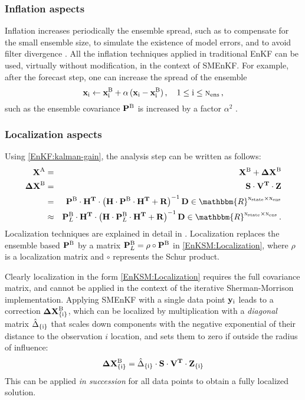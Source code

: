 \documentclass[12pt]{article}
\newcommand{\Nens}{\textsc{n}_{{\rm ens}}}
\newcommand{\Nstate}{\textsc{n}_{{\rm state}}}
\newcommand{\XA}{{\bf X}^{\rm A}}
\newcommand{\XB}{{\bf X}^{\rm B}}
\newcommand{\DXB}{{\bf \Delta X}^{\rm B}}
\newcommand{\xb}[1]{{\bf x}^{\rm B}_{{\rm #1}}}
\newcommand{\PB}{{\bf P}^{\rm B}}
\newcommand{\R}{{\bf R}}
\renewcommand{\S}{{\bf S}}
\newcommand{\Z}{{\bf Z}}
\newcommand{\D}{{\bf D}}
\newcommand{\V}{{\bf V}}
\newcommand{\y}[1]{{\bf y}_{{\rm #1}}}
\newcommand{\Lo}{{\bf H}}
\renewcommand{\Re}{\mathbbm{R}}
\newcommand{\x}{{\bf x}}
\begin{document}
\subsubsection{Inflation aspects}
Inflation increases periodically the ensemble spread, such as to compensate for the small ensemble size, to
simulate the existence of model errors, and to avoid filter divergence \cite{LiHong2009}.	
All the inflation techniques applied in traditional EnKF can be used, virtually without modification, 	
in the context of SMEnKF. For example, after the forecast step, one can increase the spread of the ensemble
\[
\x_{\rm i} \leftarrow \xb{i} + \alpha \, (\x_{\rm i}-\xb{i})\,, \quad 1 \le \rm i \le \Nens\,,
\]
such as the ensemble covariance $\PB$ is increased by a factor $\alpha^2$  \cite{WuZheng2011}. 

\subsubsection{Localization aspects}
Using \eqref{EnKF:kalman-gain}, the analysis step can be written as follows:
\begin{eqnarray}  \nonumber
\displaystyle \XA &=& \XB+ \DXB \\ \nonumber
\DXB &=& \S \cdot \V^{\bf T} \cdot \Z \\   \nonumber
&=& {\PB}  \cdot {\Lo}^{{\bf T}} \cdot \left ( {\Lo}  \cdot \PB \cdot {\Lo}^{{\bf T}} + \R \right )^{-1} \D \in \Re^{\Nstate \times \Nens}\\\
\label{EnKSM:Localization}
&\approx& \PB_L  \cdot {\Lo}^{{\bf T}} \cdot \left ( {\Lo}  \cdot \PB_L \cdot {\Lo}^{{\bf T}} + \R \right )^{-1} \D \in \Re^{\Nstate \times \Nens}\,.
\end{eqnarray}
Localization techniques are explained in detail in \cite{Anderson200799}.
Localization replaces the ensemble based $\PB$ by a matrix $\PB_L = \rho \circ \PB$ in \eqref{EnKSM:Localization}, where $\rho$ is a localization matrix and 
 $\circ$ represents the Schur product. 
 
Clearly  localization in the form \eqref{EnKSM:Localization} requires the full covariance matrix, and cannot be applied in the context of the iterative Sherman-Morrison implementation. 
Applying SMEnKF with a single data point $\y{i}$ leads to a correction $\DXB_{\{\rm i\}}$, which can be localized
by multiplication with a {\em diagonal} matrix $\hat{\Delta}_{\{\rm i\}}$ that scales down components with the negative exponential of their distance to the observation $i$ location, and sets them to zero if outside the radius of influence:
\[
\DXB_{\{\rm i\}} = \hat{\Delta}_{\{\rm i\}} \cdot \S \cdot \V^{\bf T} \cdot \Z_{\{\rm i\}}
\]
This can be applied {\em in succession} for all data points to obtain a fully localized solution.
\end{document}

